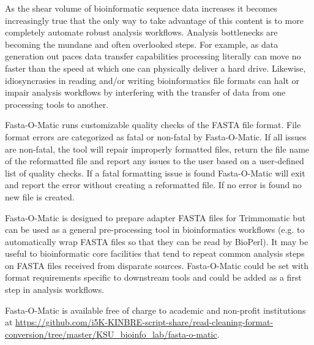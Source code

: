 As the shear volume of bioinformatic sequence data increases it becomes increasingly true that the only way to take advantage of this content is to more completely automate robust analysis workflows. Analysis bottlenecks are becoming the  mundane and often overlooked steps. For example, as data generation out paces data transfer capabilities processing literally can move no faster than the speed at which one can physically deliver a hard drive. Likewise, idiosyncrasies in reading and/or writing bioinformatics file formats can halt or impair analysis workflows by interfering with the transfer of data from one processing tools to another.

Fasta-O-Matic runs customizable quality checks of the FASTA file format. File format errors are categorized as fatal or non-fatal by Fasta-O-Matic.  If all issues are non-fatal, the tool will repair improperly formatted files, return the file name of the reformatted file and report any issues to the user based on a user-defined list of quality checks. If a fatal formatting issue is found Fasta-O-Matic will exit and report the error without creating a reformatted file. If no error is found no new file is created.

Fasta-O-Matic is designed to prepare adapter FASTA files for Trimmomatic but can be used as a general pre-processing tool in bioinformatics workflows (e.g. to automatically wrap FASTA files so that they can be read by BioPerl). It may be useful to bioinformatic core facilities that tend to repeat common analysis steps on FASTA files received from disparate sources. Fasta-O-Matic could be set with format requirements specific to downstream tools and could be added as a first step in analysis workflows.

Fasta-O-Matic is available free of charge to academic and non-profit institutions at \url{https://github.com/i5K-KINBRE-script-share/read-cleaning-format-conversion/tree/master/KSU\_bioinfo\_lab/fasta-o-matic}.
  